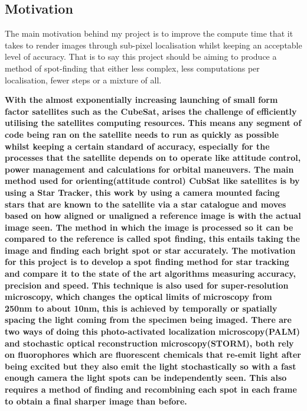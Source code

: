 \documentclass[aps,pra,a4paper,nofootinbib,onecolumn,tightenlines,longbibliography,12pt,amsfonts,amssymb,amsmath,floatfix]{revtex4-2} %
\begin{document}
  
  \subsection{Motivation} %
  \label{sub:Motivation}
  
  The main motivation behind my project is to improve the compute time that it
  takes to render images through sub-pixel localisation whilst keeping an
  acceptable level of accuracy. That is to say this project should be aiming to
  produce a method of spot-finding that either less complex, less computations
  per localisation, fewer steps or a mixture of all.

  \textbf{
  With the almost exponentially increasing launching of small form factor
  satellites such as the CubeSat, arises the challenge of efficiently utilising
  the satellites computing resources. This means any segment of code being ran on
  the satellite needs to run as quickly as possible whilst keeping a certain
  standard of accuracy, especially for the processes that the satellite depends
  on to operate like attitude control, power management and calculations for
  orbital maneuvers. The main method used for orienting(attitude control) CubSat
  like satellites is by using a Star Tracker, this work by using a camera mounted
  facing stars that are known to the satellite via a star catalogue and moves
  based on how aligned or unaligned a reference image is with the actual image
  seen.\cite{calitz2015design} The method in which the image is processed so it
  can be compared to the reference is called spot finding, this entails taking
  the image and finding each bright spot or star accurately. The motivation for
  this project is to develop a spot finding method for star tracking and compare
  it to the state of the art algorithms measuring accuracy, precision and speed.}
  \textbf{
  This technique is also used for super-resolution microscopy, which changes the
  optical limits of microscopy from 250nm to about 10nm, this is achieved by
  temporally or spatially spacing the light coming from the specimen being
  imaged. There are two ways of doing this photo-activated localization
  microscopy(PALM) and stochastic optical reconstruction microscopy(STORM), both
  rely on fluorophores which are fluorescent chemicals that re-emit light after
  being excited but they also emit the light stochastically so with a fast enough
  camera the light spots can be independently seen. This also requires a method
  of finding and recombining each spot in each frame to obtain a final sharper
  image than before.\cite{small2014fluorophore}}
  
\end{document}
